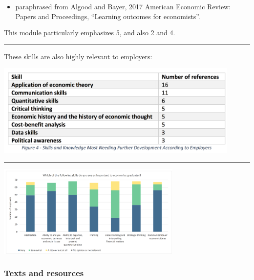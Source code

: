 \documentclass[]{article}
\providecommand{\tightlist}{%
  \setlength{\itemsep}{0pt}\setlength{\parskip}{0pt}}
\begin{document}
\begin{itemize}
\tightlist
\item
  paraphrased from Algood and Bayer, 2017 American Economic Review:
  Papers and Proceedings, ``Learning outcomes for economists''.
\end{itemize}

This module particularly emphasizes 5, and also 2 and 4.

\begin{center}\rule{0.5\linewidth}{\linethickness}\end{center}

These skills are also highly relevant to employers:

\includegraphics[height=1.8in]{picsfigs/skillschart.png}

\begin{center}\rule{0.5\linewidth}{\linethickness}\end{center}

\includegraphics[height=1.8in]{picsfigs/skillsbar.png}

\hypertarget{texts}{%
\subsubsection{Texts and resources}\label{texts}}
\end{document}
